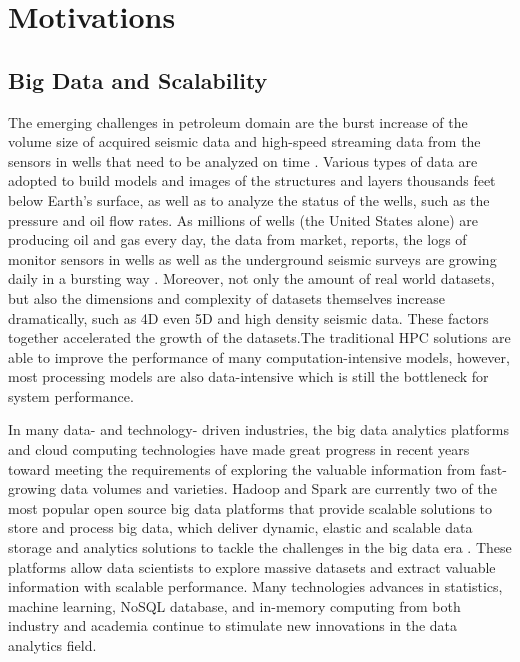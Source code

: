 

\section{Motivations}

\subsection{Big Data and Scalability}

The emerging challenges in petroleum domain are the burst increase of the volume size of acquired seismic data and high-speed streaming data from the sensors in wells that need to be analyzed on time \cite{bigdataofindustry}. Various types of data are adopted to build models and images of the structures and layers thousands feet below Earth's surface, as well as to analyze the status of the wells, such as the pressure and oil flow rates. As millions of wells (the United States alone) are producing oil and gas every day, the data from market, reports, the logs of monitor sensors in wells as well as the underground seismic surveys are growing daily in a bursting way \cite{bigdataofindustry}. Moreover, not only the amount of real world datasets, but also the dimensions and complexity of datasets themselves increase dramatically, such as 4D even 5D and high density seismic data. These factors together accelerated the growth of the datasets.The traditional HPC solutions are able to improve the performance of many computation-intensive models, however,  most processing models are also data-intensive which is still the bottleneck for system performance. 

In many data- and technology- driven industries, the big data analytics platforms and cloud computing technologies have made great progress in recent years toward meeting the requirements of exploring the valuable information from fast-growing data volumes and varieties.  Hadoop and Spark are currently two of the most popular open source big data platforms that provide scalable solutions to store and process big data, which deliver dynamic, elastic and scalable data storage and analytics solutions to tackle the challenges in the big data era \cite{SparkWiki}. These platforms allow data scientists to explore massive datasets and extract valuable information with scalable performance. Many technologies advances in statistics, machine learning, NoSQL database, and in-memory computing from both industry and academia continue to stimulate new innovations in the data analytics field.

